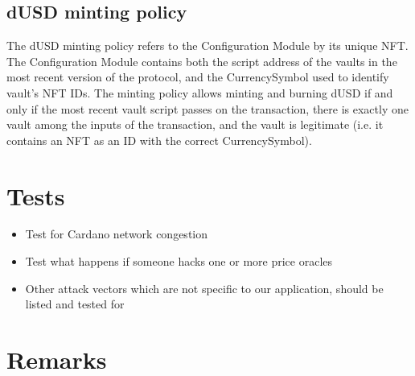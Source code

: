 \documentclass{article} %
\begin{document}
\subsection{dUSD minting policy}

The dUSD minting policy refers to the Configuration Module by its unique NFT.
The Configuration Module contains both the script address of the vaults in the
most recent version of the protocol, and the CurrencySymbol used to identify
vault's NFT IDs. The minting policy allows minting and burning dUSD if and only
if the most recent vault script passes on the transaction, there is exactly one
vault among the inputs of the transaction, and the vault is legitimate (i.e. it
contains an NFT as an ID with the correct CurrencySymbol).

\section{Tests}

\begin{itemize}
  \item Test for Cardano network congestion
  \item Test what happens if someone hacks one or more price oracles
  \item Other attack vectors which are not specific to our application, should
    be listed and tested for
\end{itemize}

\section{Remarks}
\end{document}
